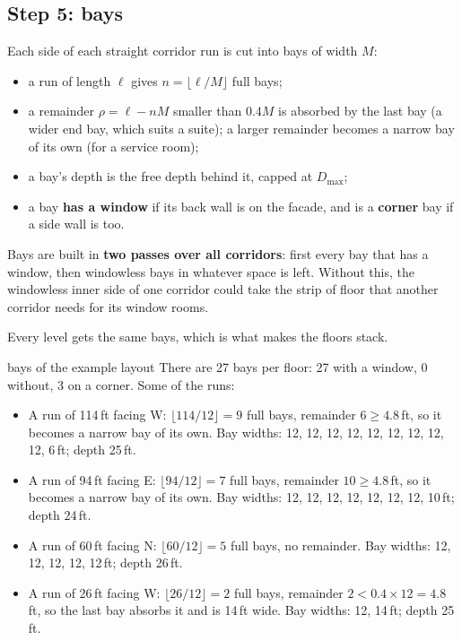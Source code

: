 \documentclass[10pt,a4paper]{article}
\begin{document}
\subsection{Step 5: bays}
Each side of each straight corridor run is cut into bays of width $M$:
\begin{itemize}
\item a run of length $\ell$ gives $n = \lfloor \ell / M \rfloor$ full bays;
\item a remainder $\rho = \ell - nM$ smaller than $0.4M$ is absorbed by the last bay (a wider end bay, which suits a
suite); a larger remainder becomes a narrow bay of its own (for a service room);
\item a bay's depth is the free depth behind it, capped at $D_{\max}$;
\item a bay \textbf{has a window} if its back wall is on the facade, and is a \textbf{corner} bay if a side wall is too.
\end{itemize}
Bays are built in \textbf{two passes over all corridors}: first every bay that has a window, then windowless bays in
whatever space is left. Without this, the windowless inner side of one corridor could take the strip of floor that
another corridor needs for its window rooms.

Every level gets the same bays, which is what makes the floors stack.

\begin{example}{bays of the example layout}
There are 27 bays per floor: 27 with a window, 0 without, 3 on a corner. Some of the runs:
\begin{itemize}
\item A run of 114\,ft facing W: $\lfloor 114/12 \rfloor = 9$ full bays, remainder $6 \ge 4.8$\,ft, so it becomes a narrow bay of its own. Bay widths: 12, 12, 12, 12, 12, 12, 12, 12, 12, 6\,ft; depth 25\,ft.
\item A run of 94\,ft facing E: $\lfloor 94/12 \rfloor = 7$ full bays, remainder $10 \ge 4.8$\,ft, so it becomes a narrow bay of its own. Bay widths: 12, 12, 12, 12, 12, 12, 12, 10\,ft; depth 24\,ft.
\item A run of 60\,ft facing N: $\lfloor 60/12 \rfloor = 5$ full bays, no remainder. Bay widths: 12, 12, 12, 12, 12\,ft; depth 26\,ft.
\item A run of 26\,ft facing W: $\lfloor 26/12 \rfloor = 2$ full bays, remainder $2 < 0.4 \times 12 = 4.8$\,ft, so the last bay absorbs it and is 14\,ft wide. Bay widths: 12, 14\,ft; depth 25\,ft.
\end{itemize}
\end{example}
\end{document}
